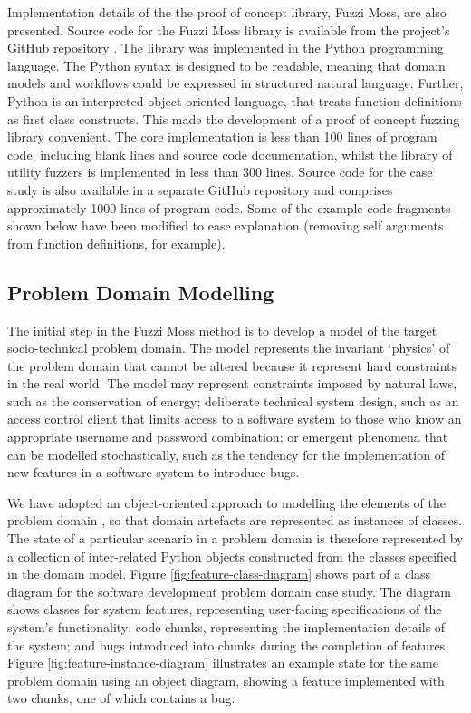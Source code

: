 \documentclass{sig-alternate}
\begin{document}
Implementation details of the the proof of concept library, Fuzzi Moss, are also presented.  Source code for the Fuzzi
Moss library is available from the project's GitHub repository \citep{wallis2016fuzzi-moss-scm}.  The library was
implemented in the Python programming language.  The Python syntax is designed to be readable, meaning that domain
models and workflows could be expressed in structured natural language.  Further, Python is an interpreted
object-oriented language, that treats function definitions as first class constructs.  This made the development of a
proof of concept fuzzing library convenient.  The core implementation is less than 100 lines of program code, including
blank lines and source code documentation, whilst the library of utility fuzzers is implemented in less than 300
lines. Source code for the case study is also available in a separate GitHub repository
\citep{storer2016softdev-workflow-scm} and comprises approximately 1000 lines of program code.  Some of the example code
fragments shown below have been modified to ease explanation (removing self arguments from function definitions, for
example).


\subsection{Problem Domain Modelling}


The initial step in the Fuzzi Moss method is to develop a model of the target socio-technical problem domain.  The model
represents the invariant `physics' of the problem domain that cannot be altered because it represent hard constraints in
the real world.  The model may represent constraints imposed by natural laws, such as the conservation of energy;
deliberate technical system design, such as an access control client that limits access to a software system to those
who know an appropriate username and password combination; or emergent phenomena that can be modelled stochastically,
such as the tendency for the implementation of new features in a software system to introduce bugs.

We have adopted an object-oriented approach to modelling the elements of the problem domain \citep{bennett06object}, so
that domain artefacts are represented as instances of classes.  The state of a particular scenario in a problem domain
is therefore represented by a collection of inter-related Python objects constructed from the classes specified in the
domain model.  Figure \ref{fig:feature-class-diagram} shows part of a class diagram for the software development problem
domain case study.  The diagram shows classes for system features, representing user-facing specifications of the
system's functionality; code chunks, representing the implementation details of the system; and bugs introduced into
chunks during the completion of features.  Figure \ref{fig:feature-instance-diagram} illustrates an example state for
the same problem domain using an object diagram, showing a feature implemented with two chunks, one of which contains a
bug.
\end{document}
